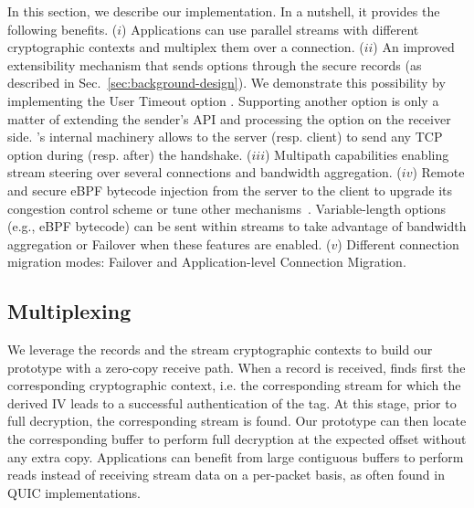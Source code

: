 \label{sec:content}

In this section, we describe our \tcpls implementation. In a nutshell, it provides the following benefits.
($i$) Applications can use parallel streams with different cryptographic contexts and multiplex them over a \tcp connection.
($ii$) An improved \tcp extensibility mechanism that sends \tcp options
   through the secure \tcpls records (as described in
   Sec.~\ref{sec:background-design}). We demonstrate this possibility by
   implementing the \tcp User Timeout option%
   . Supporting another \tcp option is only a matter of
   extending the sender's API and processing the option on the receiver side.
   \tcpls's internal machinery allows to the server (resp. client) to send any
   TCP option during (resp. after) the \tls handshake.
($iii$) Multipath capabilities enabling stream steering over several \tcp connections and bandwidth aggregation.
($iv$) Remote and secure eBPF bytecode injection from the server to the client to upgrade its \tcp congestion control scheme or tune other \tcp mechanisms~\cite{brakmo2017tcp,tran2019beyond}. Variable-length options (e.g., eBPF bytecode) can be sent within streams to take advantage of bandwidth aggregation or Failover when these features are enabled.
($v$) Different connection migration modes: Failover and Application-level
Connection Migration.

\subsection{Multiplexing}

We leverage the \tcpls records and the \tcpls stream cryptographic contexts to 
build our prototype with a zero-copy receive path. When a record is received,
\tcpls finds first the corresponding cryptographic context, i.e. the
corresponding \tcpls stream for which the derived IV leads to a successful
authentication of the tag. At this stage, prior to full decryption, the 
corresponding stream is found. Our prototype can then locate the corresponding buffer
to perform full decryption at the expected offset without any extra copy.
Applications can benefit from large contiguous
buffers to perform reads instead of receiving stream data on a per-packet basis,
as often found in QUIC implementations.

